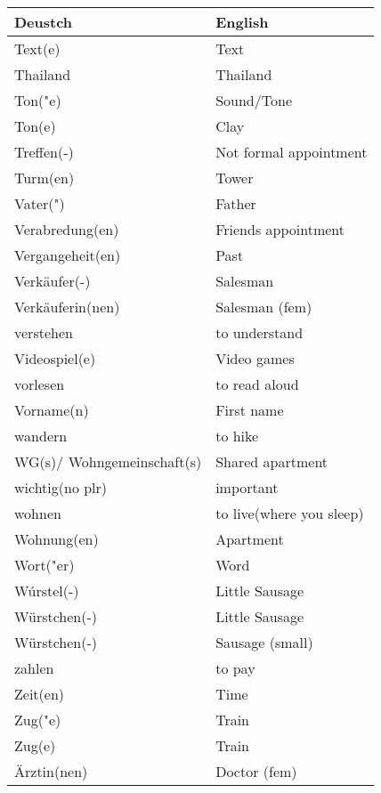 \documentclass{article}
\renewcommand{\arraystretch}{1}
\begin{document}
\newpage

\begin{minipage}{0.48\textwidth}
    \centering
    \renewcommand{\arraystretch}{1.5}
    \begin{tabular}{|>{\raggedright\arraybackslash}p{3.5cm}|>{\raggedright\arraybackslash}p{3.5cm}|}
        \hline
        \rowcolor{gray!20} \textbf{Deustch} & \textbf{English} \\
        \hline
        Text(e) & Text \\\hline
        Thailand & Thailand \\\hline
        Ton("e) & Sound/Tone \\\hline
        Ton(e) & Clay \\\hline
        Treffen(-) & Not formal appointment \\\hline
        Turm(en) & Tower \\\hline
        Vater(") & Father \\\hline
        Verabredung(en) & Friends appointment \\\hline
        Vergangeheit(en) & Past \\\hline
        Verkäufer(-) & Salesman \\\hline
        Verkäuferin(nen) & Salesman (fem) \\\hline
        verstehen & to understand \\\hline
        Videospiel(e) & Video games \\\hline
        vorlesen & to read aloud \\\hline
        Vorname(n) & First name \\\hline
        wandern & to hike \\\hline
        WG(s)/ Wohngemeinschaft(s) & Shared apartment \\\hline
        wichtig(no plr) & important \\\hline
        wohnen & to live(where you sleep) \\\hline
        Wohnung(en) & Apartment \\\hline
        Wort("er) & Word \\\hline
        Wúrstel(-) & Little Sausage \\\hline
        Würstchen(-) & Little Sausage \\\hline
        Würstchen(-) & Sausage (small) \\\hline
        zahlen & to pay \\\hline
        Zeit(en) & Time \\\hline
        Zug("e) & Train \\\hline
        Zug(e) & Train \\\hline
        Ärztin(nen) & Doctor (fem) \\\hline
    \end{tabular}
\end{minipage}%
\end{document}

